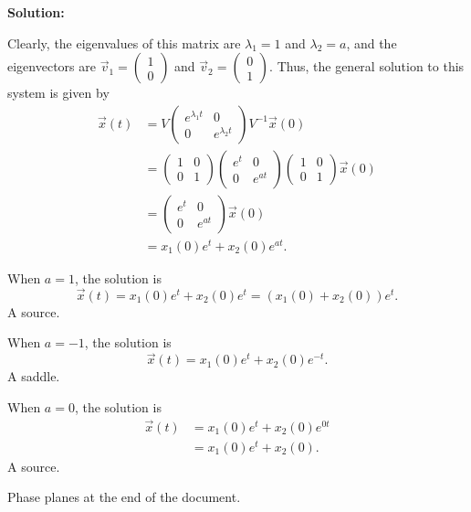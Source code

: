 \documentclass[12pt]{article}
\newenvironment{solution}{
    \textbf{Solution:}
    
}{
    
    \vspace{2em}
}
\begin{document}
\begin{solution}
    Clearly, the eigenvalues of this matrix are \(\lambda_1 = 1\) and \(\lambda_2 = a\), and the eigenvectors are \(\vec{v}_1 = \begin{pmatrix} 1 \\ 0 \end{pmatrix}\) and \(\vec{v}_2 = \begin{pmatrix} 0 \\ 1 \end{pmatrix}\). Thus, the general solution to this system is given by
    \[
        \begin{aligned}
            \vec{x}(t) &= V \begin{pmatrix} e^{\lambda_1 t} & 0 \\ 0 & e^{\lambda_2 t} \end{pmatrix} V^{-1} \vec{x}(0) \\
            &= \begin{pmatrix} 1 & 0 \\ 0 & 1 \end{pmatrix} \begin{pmatrix} e^{t} & 0 \\ 0 & e^{at} \end{pmatrix} \begin{pmatrix} 1 & 0 \\ 0 & 1 \end{pmatrix} \vec{x}(0) \\
            &= \begin{pmatrix} e^{t} & 0 \\ 0 & e^{at} \end{pmatrix} \vec{x}(0) \\
            &= x_1(0)e^t + x_2(0)e^{at}.
        \end{aligned}
    \]

    When \(a = 1\), the solution is
    \[
        \vec{x}(t) = x_1(0)e^t + x_2(0)e^t = (x_1(0) + x_2(0))e^t.
    \]
    A source.

    When \(a = -1\), the solution is
    \[
        \vec{x}(t) = x_1(0)e^t + x_2(0)e^{-t}.
    \]
    A saddle.

    When \(a = 0\), the solution is
    \[
        \begin{aligned}
            \vec{x}(t) &= x_1(0)e^t + x_2(0)e^{0t} \\
            &= x_1(0)e^t + x_2(0).
        \end{aligned}
    \]
    A source.

    Phase planes at the end of the document.
    
    
\end{solution}
\end{document}

